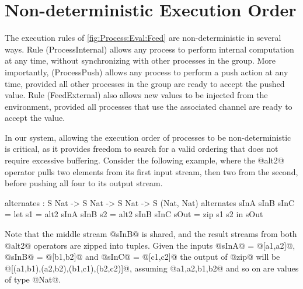 \section{Non-deterministic Execution Order}
\label{s:EvaluationOrder}
%
%
%
%
%
%

The execution rules of \autoref{fig:Process:Eval:Feed} are non-deterministic in several ways. Rule (ProcessInternal) allows any process to perform internal computation at any time, without synchronizing with other processes in the group. More importantly, (ProcessPush) allows any process to perform a push action at any time, provided all other processes in the group are ready to accept the pushed value. Rule (FeedExternal) also allows new values to be injected from the environment, provided all processes that use the associated channel are ready to accept the value.

In our system, allowing the execution order of processes to be non-deterministic is critical, as it provides freedom to search for a valid ordering that does not require excessive buffering. Consider the following example, where the @alt2@ operator pulls two elements from its first input stream, then two from the second, before pushing all four to its output stream.
\begin{code}
  alternates : S Nat -> S Nat -> S Nat -> S (Nat, Nat)
  alternates sInA sInB sInC
   = let  s1   = alt2 sInA sInB
          s2   = alt2 sInB sInC
          sOut = zip s1 s2
     in   sOut
\end{code}

Note that the middle stream @sInB@ is shared, and the result streams from both @alt2@ operators are zipped into tuples. Given the inputs @sInA@ = @[a1,a2]@, @sInB@ = @[b1,b2]@ and @sInC@ = @[c1,c2]@ the output of @zip@ will be @[(a1,b1),(a2,b2),(b1,c1),(b2,c2)]@, assuming @a1,a2,b1,b2@ and so on are values of type @Nat@.

